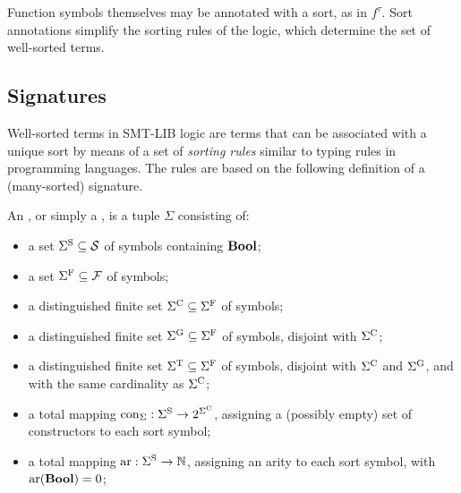 Function symbols themselves may be annotated with a sort, as in $f^\tau$.
Sort annotations simplify the sorting rules of the logic,
which determine the set of well-sorted terms.


\subsection{Signatures} \label{sec:signature}

Well-sorted terms in SMT-LIB logic are terms that can be associated
with a unique sort by means of a set of \emph{sorting rules}
similar to typing rules in programming languages.
The rules are based on the following definition of 
a (many-sorted) signature.

\begin{definition}
\label{def:signature}
An , or simply a ,
is a tuple $\Sigma$ consisting of:

\begin{itemize}
\item
a set $\Sigma^\mathrm{S} \subseteq \mathcal{S}$ of  symbols containing $\textbf{Bool}$;

\item
a set $\Sigma^\mathrm{F} \subseteq \mathcal{F}$ of  symbols;

\item
a distinguished finite set $\Sigma^\mathrm{C} \subseteq \Sigma^\mathrm{F}$ 
of  symbols;

\item
a distinguished finite set $\Sigma^\mathrm{G} \subseteq \Sigma^\mathrm{F}$ 
of  symbols,
disjoint with $\Sigma^\mathrm{C}$;

\item
a distinguished finite set $\Sigma^\mathrm{T} \subseteq \Sigma^\mathrm{F}$ 
of  symbols,
disjoint with $\Sigma^\mathrm{C}$ and $\Sigma^\mathrm{G}$, and with the same cardinality
as $\Sigma^\mathrm{C}$;

\item
a total mapping $\mathrm{con}_\Sigma:\Sigma^\mathrm{S} \to 2^{\Sigma^\mathrm{C}}$,
assigning a (possibly empty) set of constructors to each sort symbol;

\item
a total mapping $\mathrm{ar}:\Sigma^\mathrm{S} \to \mathbb{N}$,
assigning an arity to each sort symbol,
with $\mathrm{ar}(\textbf{Bool}) = 0$;


\end{itemize}
\end{definition}
